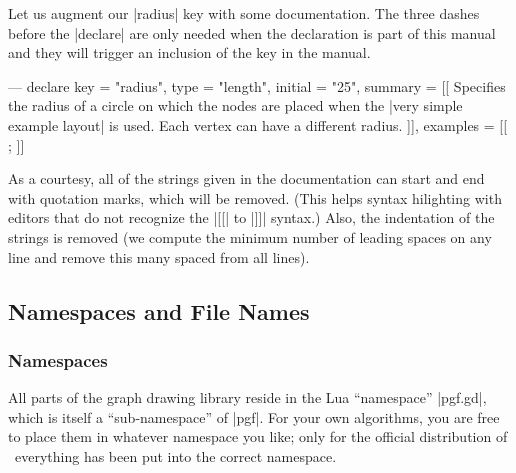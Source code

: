 Let us augment our |radius| key with some documentation. The three
dashes before the |declare| are only needed when the declaration is
part of this manual and they will trigger an inclusion of the key in
the manual.

\begin{codeexample}
--- 
declare {
  key = "radius",
  type = "length",
  initial = "25",
  summary = [[
    Specifies the radius of a circle on which the nodes are placed when
    the |very simple example layout| is used. Each vertex can have a
    different radius.
  ]],
  examples = [[
    \tikz {};
  ]]
}
\end{codeexample}

As a courtesy, all of the strings given in the documentation can start
and end with quotation marks, which will be removed. (This helps
syntax hilighting with editors that do not recognize the |[[| to |]]|
syntax.) Also, the indentation of the strings is removed (we compute
the minimum number of leading spaces on any line and remove this many
spaced from all lines).



\subsection{Namespaces and File Names}

\label{section-gd-namespaces}

\subsubsection{Namespaces}

All parts of the graph drawing library reside in the Lua ``namespace''
|pgf.gd|, which is itself a ``sub-namespace'' of |pgf|. For your own
algorithms, you are free to place them in whatever namespace you like;
only for the official distribution of \pgfname\ everything has been
put into the correct namespace.

